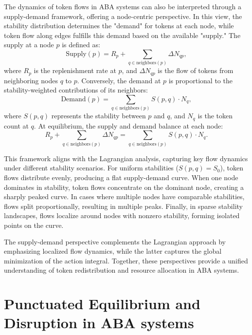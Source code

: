 \documentclass[entropy,article,submit,pdftex,oneauthor]{Definitions/mdpi}
\begin{document}
The dynamics of token flows in ABA systems can also be interpreted through a supply-demand framework, offering a node-centric perspective. In this view, the stability distribution determines the "demand" for tokens at each node, while token flow along edges fulfills this demand based on the available "supply." The supply at a node \(p\) is defined as:
\begin{equation}
\text{Supply}(p) = R_p + \sum_{q \in \text{neighbors}(p)} \Delta N_{qp},
\end{equation}
where \(R_p\) is the replenishment rate at \(p\), and \(\Delta N_{qp}\) is the flow of tokens from neighboring nodes \(q\) to \(p\). Conversely, the demand at \(p\) is proportional to the stability-weighted contributions of its neighbors:
\begin{equation}
\text{Demand}(p) = \sum_{q \in \text{neighbors}(p)} S(p, q) \cdot N_q,
\end{equation}
where \(S(p, q)\) represents the stability between \(p\) and \(q\), and \(N_q\) is the token count at \(q\). At equilibrium, the supply and demand balance at each node:
\begin{equation}
R_p + \sum_{q \in \text{neighbors}(p)} \Delta N_{qp} = \sum_{q \in \text{neighbors}(p)} S(p, q) \cdot N_q.
\end{equation}

This framework aligns with the Lagrangian analysis, capturing key flow dynamics under different stability scenarios. For uniform stabilities (\(S(p, q) = S_0\)), token flows distribute evenly, producing a flat supply-demand curve. When one node dominates in stability, token flows concentrate on the dominant node, creating a sharply peaked curve. In cases where multiple nodes have comparable stabilities, flows split proportionally, resulting in multiple peaks. Finally, in sparse stability landscapes, flows localize around nodes with nonzero stability, forming isolated points on the curve.

The supply-demand perspective complements the Lagrangian approach by emphasizing localized flow dynamics, while the latter captures the global minimization of the action integral. Together, these perspectives provide a unified understanding of token redistribution and resource allocation in ABA systems.

\section{Punctuated Equilibrium and Disruption in ABA systems}
\end{document}
